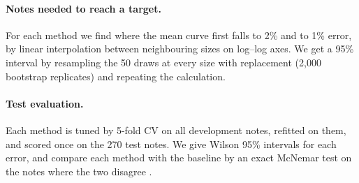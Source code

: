 \paragraph{Notes needed to reach a target.} For each method we find where the mean curve first falls to 2\% and to 1\% error, by linear interpolation between neighbouring sizes on log--log axes. We get a 95\% interval by resampling the 50 draws at every size with replacement (2,000 bootstrap replicates) and repeating the calculation.

\paragraph{Test evaluation.} Each method is tuned by 5-fold CV on all development notes, refitted on them, and scored once on the 270 test notes. We give Wilson 95\% intervals for each error, and compare each method with the baseline by an exact McNemar test on the notes where the two disagree \cite{dietterich1998approximate}.
